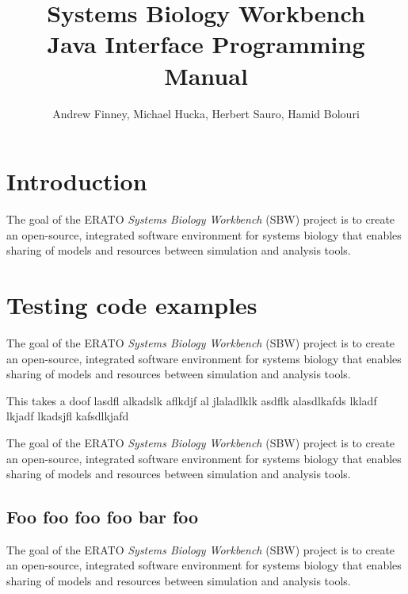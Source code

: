 \documentclass{cekmanual}
\begin{document}
\title{Systems Biology Workbench\\[5pt]
  Java Interface Programming Manual}

\author{Andrew Finney, Michael Hucka, Herbert Sauro, Hamid Bolouri}


\address{Systems Biology Workbench Development Group\\
  ERATO Kitano Systems Biology Project\\
  Control and Dynamical Systems, MC 107-81\\
  California Institute of Technology, Pasadena, CA 91125, USA\\[3pt]
  {\url{http://www.cds.caltech.edu/erato}}}


\maketitlepage


\section{Introduction}

The goal of the ERATO \emph{Systems Biology Workbench} (SBW) project is to
create an open-source, integrated software environment for systems biology
that enables sharing of models and resources between simulation and
analysis tools.

\section{Testing code examples}


The goal of the ERATO \emph{Systems Biology Workbench} (SBW) project is to
create an open-source, integrated software environment for systems biology
that enables sharing of models and resources between simulation and
analysis tools.

{This takes a doof lasdfl alkadslk aflkdjf al jlaladlklk asdflk alasdlkafds
  lkladf lkjadf lkadsjfl kafsdlkjafd}


The goal of the ERATO \emph{Systems Biology Workbench} (SBW) project is to
create an open-source, integrated software environment for systems biology
that enables sharing of models and resources between simulation and
analysis tools.

\subsection{Foo foo foo foo bar foo}

The goal of the ERATO \emph{Systems Biology Workbench} (SBW) project is to
create an open-source, integrated software environment for systems biology
that enables sharing of models and resources between simulation and
analysis tools.
\end{document}
